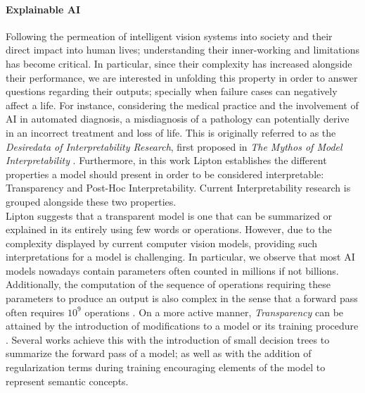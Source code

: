 \paragraph{Explainable AI} Following the permeation of intelligent vision systems into society and 
their direct impact into human lives; understanding their inner-working and limitations has become 
critical. In particular, since their complexity has increased alongside their performance, we are 
interested in unfolding this property in order to answer questions regarding their outputs; 
specially when failure cases can negatively affect a life. For instance, considering the medical 
practice and the involvement of AI in automated diagnosis, a misdiagnosis of a pathology can 
potentially derive in an incorrect treatment and loss of life. This is originally referred to as the 
\emph{Desiredata of Interpretability Research}, first proposed in \emph{The Mythos of Model 
Interpretability} \autocite{mythos_interp}. Furthermore, in this work Lipton establishes the 
different properties a model should present in order to be considered interpretable: Transparency 
and Post-Hoc Interpretability. Current Interpretability research is grouped alongside these 
two properties.\\

\noindent Lipton suggests that a transparent model is one that can be summarized or explained 
in its entirely using few words or operations. However, due to the complexity displayed by current 
computer vision models, providing such interpretations for a model is challenging. In particular, 
we observe that most AI models nowadays contain parameters often counted in millions if not 
billions. Additionally, the computation of the sequence of operations requiring these parameters 
to produce an output is also complex in the sense that a forward pass often requires $10^9$ 
operations \autocite{openai_compute}. On a more active manner, \emph{Transparency} can be attained 
by the introduction of modifications to a model or its training procedure 
\autocite{zhang2021survey}. Several works achieve this with the introduction of small decision 
trees to summarize the forward pass of a model; as well as with the addition of regularization terms 
during training encouraging elements of the model to represent semantic concepts.\\



